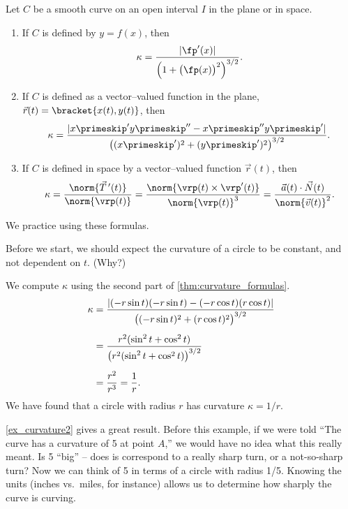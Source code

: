 {Let $C$ be a smooth curve on an open interval $I$ in the plane or in space.
\begin{enumerate}
	\item If $C$ is defined by $y=f(x)$, then 
	$$\kappa = \frac{|\fp'(x)|}{\Big(1+\big(\fp(x)\big)^2\Big)^{3/2}}.$$
	\item	If $C$ is defined as a vector--valued function in the plane, $\vec r(t) =\bracket{x(t), y(t)}$, then
	$$\kappa = \frac{|x\primeskip'y\primeskip''-x\primeskip''y\primeskip'|}{\big((x\primeskip')^2+(y\primeskip')^2\big)^{3/2}}.$$
	\item If $C$ is defined in space by a vector--valued function $\vec r(t)$, then
$$\kappa = \frac{\norm{\vec T\,'(t)}}{\norm{\vrp(t)}} = \frac{\norm{\vrp(t)\times\vrp'(t)}}{\norm{\vrp(t)}^3} = \frac{\vec a(t)\cdot \vec N(t)}{\norm{\vec v(t)}^2}.$$
\end{enumerate}}

We practice using these formulas.

{Before we start, we should expect the curvature of a circle to be constant, and not dependent on $t$. (Why?)

We compute $\kappa$ using the second part of \autoref{thm:curvature_formulas}.
\begin{align*}
\kappa &= \frac{|(-r\sin t)(-r\sin t) - (-r\cos t)(r\cos t)|}{\big( (-r\sin t)^2+(r\cos t)^2\big)^{3/2}} \\
			&= \rule{0pt}{20pt}\frac{r^2(\sin^2t+\cos^2t)}{\big(r^2(\sin^2t+\cos^2t)\big)^{3/2}}\\
			&= \rule{0pt}{20pt}\frac{r^2}{r^3} = \frac1r.
\end{align*}
We have found that a circle with radius $r$ has curvature $\kappa = 1/r$.}

\autoref{ex_curvature2} gives a great result. Before this example, if we were told ``The curve has a curvature of 5 at point $A$,'' we would have no idea what this really meant. Is 5 ``big'' -- does is correspond to a really sharp turn, or a not-so-sharp turn? Now we can think of 5 in terms of a circle with radius 1/5. Knowing the units (inches vs.\ miles, for instance) allows us to determine how sharply the curve is curving.\bigskip

